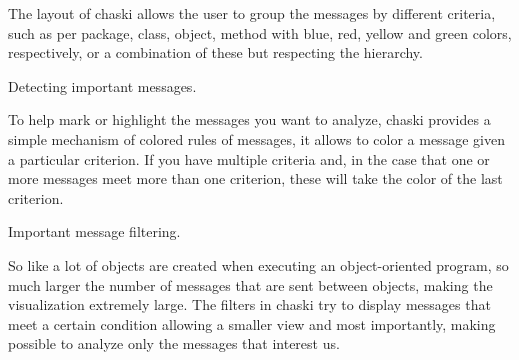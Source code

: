 \documentclass{elsart}
\begin{document}
The layout of chaski allows the user to group the messages by different criteria, such as per package, class, object, method with blue, red, yellow and green colors, respectively, or a combination of these but respecting the hierarchy.

Detecting important messages.

To help mark or highlight the messages you want to analyze, chaski provides a simple mechanism of colored rules of messages, it allows to color a message given a particular criterion. If you have multiple criteria and, in the case that one or more messages meet more than one criterion, these will take the color of the last criterion.

Important message filtering.

So like a lot of objects are created when executing an object-oriented program,  so much larger the number of messages that are sent between objects, making the visualization extremely large. The filters in chaski try to display messages that meet a certain condition allowing a smaller view and most importantly, making  possible to analyze only the messages that interest us.

\label{}



\begin{thebibliography}{00}




\bibitem{}

\end{thebibliography}
\end{document}
